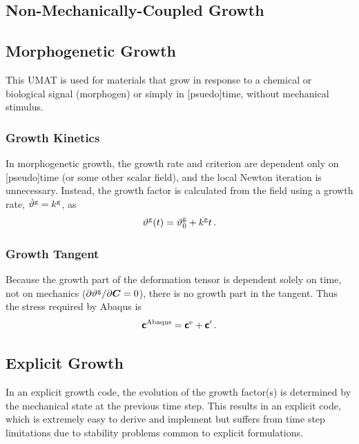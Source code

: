\documentclass[10pt,letterpaper,oneside]{report}
\newcommand{\ten}[1]{\mbox{\boldmath $#1$}{}}
\newcommand{\tenf}[1]{\mbox{{\sffamily{\bfseries {#1}}}}}
\newcommand{\scas}[1]{\mbox{{\scriptsize{${\rm{#1}}$}}}{}}
\begin{document}
\begin{itemize}
\section{Non-Mechanically-Coupled Growth}

\subsection{Morphogenetic Growth}
This UMAT is used for materials that grow in response to a chemical or biological signal (morphogen) or simply in [psuedo]time, without mechanical stimulus.  

\subsubsection{Growth Kinetics}
In morphogenetic growth, the growth rate and criterion are dependent only on [pseudo]time (or some other scalar field), and the local Newton iteration is unnecessary.  Instead, the growth factor is calculated from the field using a growth rate, $\dot{\vartheta}^{\scas{g}} = k^{\scas{g}}$, as
\begin{equation}
\vartheta^{\scas{g}} (t) = \vartheta^{\scas{g}}_0 + k^{\scas{g}} t \, . 
\end{equation}

\subsubsection{Growth Tangent}
Because the growth part of the deformation tensor is dependent solely on time, not on mechanics ($\partial \vartheta^{\scas{g}} / \partial \ten{C} = 0$), there is no growth part in the tangent.  Thus the stress required by Abaqus is 
\begin{equation}
\tenf{c}^{\scas{Abaqus}} = \tenf{c}^{\scas{e}} + \tenf{c}' \, . 
\end{equation}


\subsection{Explicit Growth}
In an explicit growth code, the evolution of the growth factor(s) is determined by the mechanical state at the previous time step.  This results in an explicit code, which is extremely easy to derive and implement but suffers from time step limitations due to stability problems common to explicit formulations.  


\end{itemize}
\end{document}

